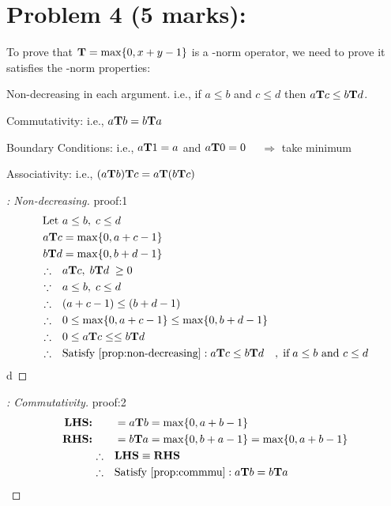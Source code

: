 \documentclass{tron}
\begin{document}
\section{Problem 4 (5 marks): }
To prove that $\textbf{T} = \max \{0, x+y - 1\}$ is a \T-norm operator, we need to prove it satisfies the \T-norm properties:
\begin{property-list}
	\item Non-decreasing in each argument. i.e., if $a\leq b$ and $c \leq d$ then $a \textbf{T} c \leq b\textbf{T} d$. \label{prop:non-decreasing}
	\item Commutativity: i.e., $a\textbf{T} b = b\textbf{T} a$ \label{prop:commmu}
	\item Boundary Conditions: i.e., $a\textbf{T} 1 = a$ and $a\textbf{T} 0 = 0$ $\quad \Rightarrow $ take minimum \label{prop:bnd}
	\item Associativity: i.e., $(a\textbf{T} b)\textbf{T} c = a\textbf{T}(b\textbf{T} c)$ \label{prop:assoc}
\end{property-list}

\begin{proof}[: Non-decreasing]{proof:1}
	\begin{align}
		\text{Let }&  a \leq b, \; c \leq d \\
		a\T c & =  \max \{0, a + c - 1\} \\
		b\T d & =  \max \{0, b + d - 1\} \\
		\therefore \quad & a\T c, \; b\T d\; \geq 0 \\
		\because \quad & a \leq b, \; c \leq d \\
		\therefore \quad & (a + c - 1) \leq (b + d - 1) \\
		\therefore \quad & 0 \leq \max \{0, a + c - 1\} \leq \max \{0, b + d - 1\}\\
		\therefore \quad & 0 \leq a \T c \leq \leq b\T d \\
		\therefore \quad & \text{Satisfy \Cref{prop:non-decreasing}}: a \T c \leq b\T d \quad \ifcond a\leq b \text{ and } c \leq d
	\end{align}d
	\QED
\end{proof}

\begin{proof}[: Commutativity]{proof:2}
	\begin{align}
		\textbf{LHS:}\qquad & = a \T b = \max \{0, a + b - 1\} \\
		\textbf{RHS:}\qquad & = b \T a = \max \{0, b + a - 1\} = \max \{0, a + b - 1\}\\
		\therefore \quad & \textbf{LHS} \equiv \textbf{RHS}\\
		\therefore \quad & \text{Satisfy \Cref{prop:commmu}}: a \T b = b \T a
	\end{align}
	\QED
\end{proof}
\end{document}

